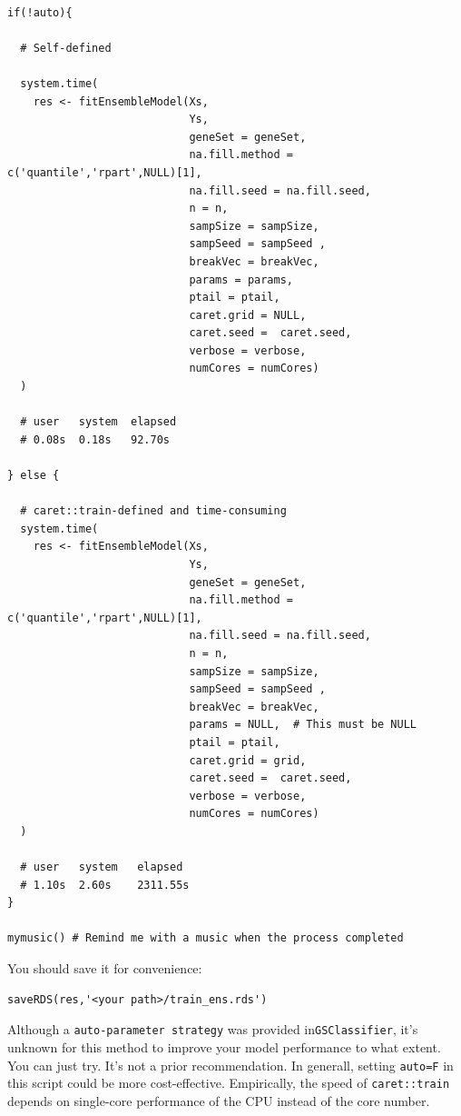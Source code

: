 \documentclass[
  12pt,
]{book}
\newcommand{\passthrough}[1]{#1}
\begin{document}
\begin{lstlisting}

if(!auto){
  
  # Self-defined
  
  system.time(
    res <- fitEnsembleModel(Xs,
                            Ys,
                            geneSet = geneSet,
                            na.fill.method = c('quantile','rpart',NULL)[1],
                            na.fill.seed = na.fill.seed,
                            n = n,
                            sampSize = sampSize,
                            sampSeed = sampSeed ,
                            breakVec = breakVec,
                            params = params,
                            ptail = ptail,
                            caret.grid = NULL,
                            caret.seed =  caret.seed,
                            verbose = verbose,
                            numCores = numCores)
  )
  
  # user   system  elapsed
  # 0.08s  0.18s   92.70s
  
} else {
  
  # caret::train-defined and time-consuming
  system.time(
    res <- fitEnsembleModel(Xs,
                            Ys,
                            geneSet = geneSet,
                            na.fill.method = c('quantile','rpart',NULL)[1],
                            na.fill.seed = na.fill.seed,
                            n = n,
                            sampSize = sampSize,
                            sampSeed = sampSeed ,
                            breakVec = breakVec,
                            params = NULL,  # This must be NULL
                            ptail = ptail,
                            caret.grid = grid,
                            caret.seed =  caret.seed,
                            verbose = verbose,
                            numCores = numCores)
  )
  
  # user   system   elapsed
  # 1.10s  2.60s    2311.55s
}

mymusic() # Remind me with a music when the process completed
\end{lstlisting}

You should save it for convenience:

\begin{lstlisting}
saveRDS(res,'<your path>/train_ens.rds')
\end{lstlisting}

Although a \passthrough{\lstinline!auto-parameter strategy!} was provided in\passthrough{\lstinline!GSClassifier!}, it's unknown for this method to improve your model performance to what extent. You can just try. It's not a prior recommendation. In generall, setting \passthrough{\lstinline!auto=F!} in this script could be more cost-effective. Empirically, the speed of \passthrough{\lstinline!caret::train!} depends on single-core performance of the CPU instead of the core number.
\end{document}
